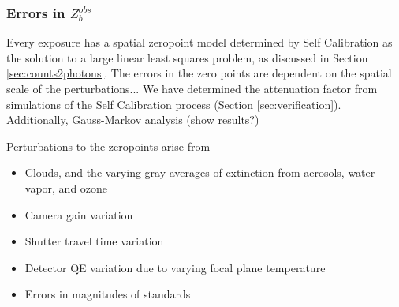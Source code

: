 \documentclass[12pt,preprint]{aastex}
\begin{document}
\subsubsection{Errors in $Z_b^{obs}$}
Every exposure has a spatial zeropoint model determined by Self Calibration as the solution to a large linear least squares problem, as discussed in Section \ref{sec:counts2photons}.  The errors in the zero points are dependent on the spatial scale of the perturbations...  We have determined the attenuation factor from simulations of the Self Calibration process (Section \ref{sec:verification}).   Additionally, Gauss-Markov analysis (show results?)

Perturbations to the zeropoints arise from
\begin{itemize}
\item{Clouds, and the varying gray averages of extinction from aerosols, water vapor, and ozone}
\item{Camera gain variation}
\item{Shutter travel time variation}
\item{Detector QE variation due to varying focal plane temperature}
\item{Errors in magnitudes of standards}
\end{itemize}
\end{document}
